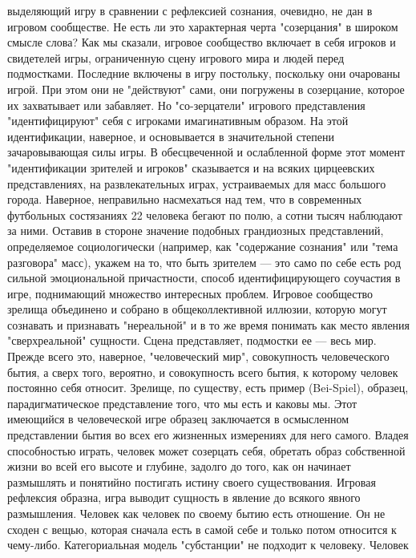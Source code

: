 \documentclass[12pt]{article}
\begin{document}
выделяющий игру в сравнении с рефлексией сознания, очевидно, не дан в игровом сообществе. Не есть ли это
характерная черта "созерцания" в широком смысле слова? Как мы сказали, игровое сообщество включает в себя
игроков  и  свидетелей  игры,  ограниченную  сцену  игрового  мира  и  людей  перед  подмостками.  Последние
включены  в  игру  постольку,  поскольку  они  очарованы  игрой.  При  этом  они  не  "действуют"  сами,  они
погружены в созерцание, которое их захватывает или забавляет. Но "со-зерцатели" игрового представления
"идентифицируют"  себя  с  игроками  имагинативным  образом.  На  этой  идентификации,  наверное,  и
основывается в значительной степени зачаровывающая силы игры. В обесцвеченной и ослабленной форме этот
момент  "идентификации  зрителей  и  игроков"  сказывается  и  на  всяких  цирцеевских  представлениях,  на
развлекательных играх, устраиваемых для масс большого города. Наверное, неправильно насмехаться над тем,
что в современных футбольных состязаниях 22 человека бегают по полю, а сотни тысяч наблюдают за ними.
Оставив в стороне значение подобных грандиозных представлений, определяемое социологически (например,
как "содержание сознания" или "тема разговора" масс), укажем на то, что быть зрителем --- это само по себе есть
род  сильной  эмоциональной  причастности,  способ  идентифицирующего  соучастия  в  игре,  поднимающий
множество интересных  проблем.  Игровое  сообщество зрелища  объединено и собрано  в  общеколлективной
иллюзии, которую могут сознавать и признавать "нереальной" и в то же время понимать как место явления
"сверхреальной"  сущности.  Сцена  представляет,  подмостки  ее  ---  весь  мир.  Прежде  всего  это,  наверное,
"человеческий мир", совокупность человеческого бытия, а сверх того, вероятно, и совокупность всего бытия, к
которому  человек  постоянно  себя  относит.  Зрелище,  по  существу,  есть  пример  (Bei-Spiel),  образец,
парадигматическое представление того, что мы есть и каковы мы. Этот имеющийся в человеческой игре образец
заключается в осмысленном представлении бытия во всех его жизненных измерениях для него самого. Владея
способностью играть, человек может созерцать себя, обретать образ собственной жизни во всей его высоте и
глубине, задолго до того, как он начинает размышлять и понятийно постигать истину своего существования.
Игровая рефлексия образна, игра выводит сущность в явление до всякого явного размышления. Человек как
человек по своему бытию есть отношение. Он не сходен с вещью, которая сначала есть в самой себе и только
потом  относится  к  чему-либо.  Категориальная  модель  "субстанции"  не  подходит  к  человеку.  Человек
\end{document}
